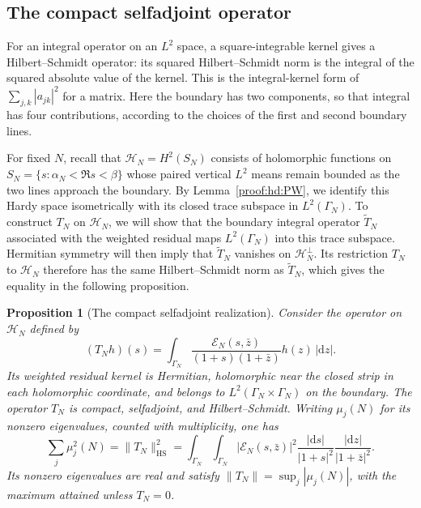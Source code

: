 \documentclass[12pt,a4paper]{amsart}
\numberwithin{equation}{section}
\theoremstyle{plain}
\newtheorem{proposition}{Proposition}[section]
\theoremstyle{definition}
\theoremstyle{remark}
\begin{document}
\subsection{The compact selfadjoint operator}

For an integral operator on an $L^2$ space, a square-integrable
kernel gives a Hilbert--Schmidt operator: its squared
Hilbert--Schmidt norm is the integral of the squared absolute
value of the kernel. This is the integral-kernel form of
$\sum_{j,k}|a_{jk}|^2$ for a matrix. Here the boundary has two
components, so that integral has four contributions, according
to the choices of the first and second boundary lines.

For fixed $N$, recall that $\mathcal H_N=H^2(S_N)$ consists of
holomorphic functions on $S_N=\{s:\alpha_N<\Re s<\beta\}$ whose
paired vertical $L^2$ means remain bounded as the two lines approach
the boundary. By Lemma~\ref{proof:hd:PW}, we identify this Hardy
space isometrically with its closed trace subspace in $L^2(\Gamma_N)$.
To construct $T_N$ on $\mathcal H_N$, we will show that the boundary
integral operator $\widetilde T_N$ associated with the weighted
residual maps $L^2(\Gamma_N)$ into this trace subspace.
Hermitian symmetry will then imply that $\widetilde T_N$ vanishes
on $\mathcal H_N^\perp$. Its restriction $T_N$ to $\mathcal H_N$
therefore has the same Hilbert--Schmidt norm as $\widetilde T_N$,
which gives the equality in the following proposition.

\begin{proposition}[The compact selfadjoint realization]\label{proof:bd:HS}
Consider the operator on $\mathcal H_N$ defined by
\[
 (T_Nh)(s)=\int_{\Gamma_N}
       \frac{\mathscr E_N(s,\bar z)}{(1+s)(1+\bar z)}h(z)\,|\mathrm{d}z|.
\]
Its weighted residual kernel is Hermitian, holomorphic near the
closed strip in each holomorphic coordinate, and belongs to
$L^2(\Gamma_N\times\Gamma_N)$ on the boundary.
The operator $T_N$ is compact, selfadjoint, and Hilbert--Schmidt. Writing $\mu_j(N)$ for its nonzero eigenvalues,
counted with multiplicity, one has
\begin{equation}\label{hd:boundary-HS-norm}
 \sum_j\mu_j^2(N)=\|T_N\|_{\mathrm{HS}}^2
 =\int_{\Gamma_N}\int_{\Gamma_N}|\mathscr E_N(s,\bar z)|^2
      \frac{|\mathrm{d}s|}{|1+s|^2}\frac{|\mathrm{d}z|}{|1+\bar z|^2}.
\end{equation}
Its nonzero eigenvalues are real and satisfy $\|T_N\|=\sup_j|\mu_j(N)|$, with the maximum attained
unless $T_N=0$.
\end{proposition}
\end{document}

